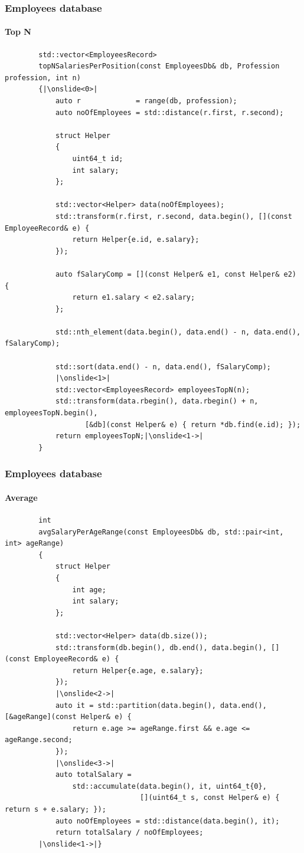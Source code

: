 \documentclass{beamer}
\begin{document}
\begin{frame}[fragile]
\frametitle{Employees database}
\framesubtitle{Top N}
	\begin{lstlisting}
		std::vector<EmployeesRecord>
		topNSalariesPerPosition(const EmployeesDb& db, Profession profession, int n)
		{|\onslide<0>|
		    auto r             = range(db, profession);
		    auto noOfEmployees = std::distance(r.first, r.second);
		
		    struct Helper
		    {
		        uint64_t id;
		        int salary;
		    };
					
		    std::vector<Helper> data(noOfEmployees);
		    std::transform(r.first, r.second, data.begin(), [](const EmployeeRecord& e) {
		        return Helper{e.id, e.salary};
		    });
			
		    auto fSalaryComp = [](const Helper& e1, const Helper& e2) {
        		return e1.salary < e2.salary;
    		};
    		
			std::nth_element(data.begin(), data.end() - n, data.end(), fSalaryComp);
			
    		std::sort(data.end() - n, data.end(), fSalaryComp);
			|\onslide<1>|
		    std::vector<EmployeesRecord> employeesTopN(n);
		    std::transform(data.rbegin(), data.rbegin() + n, employeesTopN.begin(),
                   [&db](const Helper& e) { return *db.find(e.id); });
		    return employeesTopN;|\onslide<1->|
		}
	\end{lstlisting}
\end{frame}

\begin{frame}[fragile]
\frametitle{Employees database}
\framesubtitle{Average}
	\begin{lstlisting}
		int
		avgSalaryPerAgeRange(const EmployeesDb& db, std::pair<int, int> ageRange)
		{
		    struct Helper
		    {
		        int age;
		        int salary;
		    };
		
		    std::vector<Helper> data(db.size());
		    std::transform(db.begin(), db.end(), data.begin(), [](const EmployeeRecord& e) {
		        return Helper{e.age, e.salary};
		    });
			|\onslide<2->|	
		    auto it = std::partition(data.begin(), data.end(), [&ageRange](const Helper& e) {
		        return e.age >= ageRange.first && e.age <= ageRange.second;
		    });
			|\onslide<3->|
		    auto totalSalary =
		        std::accumulate(data.begin(), it, uint64_t{0},
		                        [](uint64_t s, const Helper& e) { return s + e.salary; });
		    auto noOfEmployees = std::distance(data.begin(), it);
		    return totalSalary / noOfEmployees;
		|\onslide<1->|}
	\end{lstlisting}
\end{frame}
\end{document}

